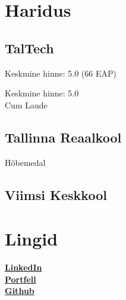 \documentclass[letterpaper]{deedy-resume} %
\begin{document}
\begin{minipage}[t]{0.33\textwidth} %


\section{Haridus}

\subsection{TalTech}

Keskmine hinne: 5.0 (66 EAP)

\sectionspace %

Keskmine hinne: 5.0 \\
Cum Laude


\sectionspace %

\subsection{Tallinna Reaalkool}

Hõbemedal

\sectionspace %

\subsection{Viimsi Keskkool}

\sectionspace %


\section{Lingid}

\href{https://www.linkedin.com/in/evo-annus-094362231/}{\bf LinkedIn} \\
\href{https://susiik.github.io/}{\bf Portfell} \\
\href{https://github.com/susIik}{\bf Github} \\


\end{minipage}
\end{document}
